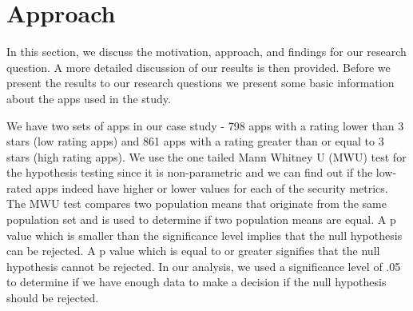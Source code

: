 \documentclass{sig-alternate}
\newcommand{\todo}[1]{\textcolor{cyan}{\textbf{[#1]}}}
\begin{document}
\section{Approach}
\label{sec:Approach}

In this section, we discuss the motivation, approach, and findings for our research question. A more detailed discussion of our results is then provided. Before we present the results to our research questions we present some basic information about the apps used in the study.

We have two sets of apps in our case study - 798 apps with a rating lower than 3 stars (low rating apps) and 861 apps with a rating greater than or equal to 3 stars (high rating apps). We use the one tailed Mann Whitney U (MWU) test for the hypothesis testing since it is non-parametric and we can find out if the low-rated apps indeed have higher or lower values for each of the security metrics. The MWU test compares two population means that originate from the same population set and is used to determine if two population means are equal. A p value which is smaller than the significance level implies that the null hypothesis can be rejected. A p value which is equal to or greater signifies that the null hypothesis cannot be rejected. In our analysis, we used a significance level of .05 to determine if we have enough data to make a decision if the null hypothesis should be rejected.







%
%
\end{document}
